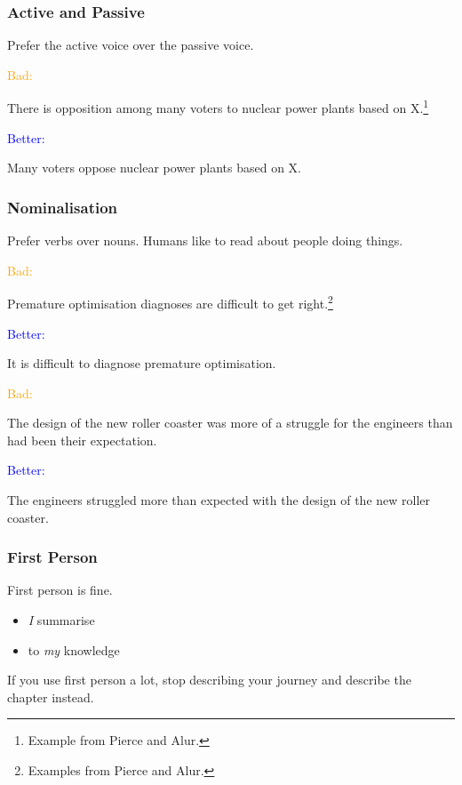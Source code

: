 \documentclass[xetex]{beamer}
\newcommand{\bad}[1]{\textcolor{orange}{#1}}
\newcommand{\good}[1]{\textcolor{blue}{#1}}
\begin{document}
\begin{frame}
  \frametitle{Active and Passive}

  Prefer the active voice over the passive voice.

  \medskip
  \pause

  \bad{Bad:}

  There is opposition among many voters to nuclear power plants based on X.\footnote{Example from Pierce and Alur.}

  \medskip
  \pause

  \good{Better:}

  Many voters oppose nuclear power plants based on X.
\end{frame}

\begin{frame}
  \frametitle{Nominalisation}

  Prefer verbs over nouns.
  Humans like to read about people doing things.

  \pause
  \medskip

  \bad{Bad:}

  Premature optimisation diagnoses are difficult to get right.\footnote{Examples from Pierce and Alur.}

  \medskip
  \pause

  \good{Better:}

  It is difficult to diagnose premature optimisation.

  \pause
  \medskip

  \bad{Bad:}

  The design of the new roller coaster was more of a struggle for the engineers than had been their expectation.

  \medskip
  \pause

  \good{Better:}

  The engineers struggled more than expected with the design of the new roller coaster.
\end{frame}

\begin{frame}
  \frametitle{First Person}

  First person is fine.
  \begin{itemize}
    \item \emph{I} summarise
    \item to \emph{my} knowledge
  \end{itemize}

  \medskip
  \pause

  If you use first person a lot, stop describing your journey and describe the chapter instead.
\end{frame}
\end{document}
